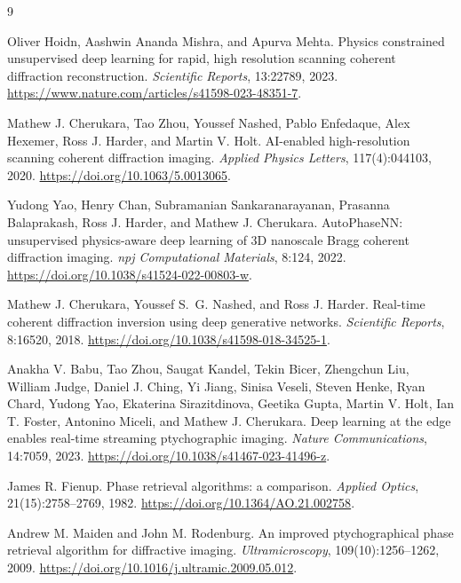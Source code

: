 \documentclass[11pt]{article}
\begin{document}
\begin{thebibliography}{9}

Oliver Hoidn, Aashwin Ananda Mishra, and Apurva Mehta.
\newblock Physics constrained unsupervised deep learning for rapid, high
resolution scanning coherent diffraction reconstruction.
\newblock \emph{Scientific Reports}, 13:22789, 2023.
\newblock \url{https://www.nature.com/articles/s41598-023-48351-7}.

Mathew J. Cherukara, Tao Zhou, Youssef Nashed, Pablo Enfedaque, Alex Hexemer,
Ross J. Harder, and Martin V. Holt.
\newblock AI-enabled high-resolution scanning coherent diffraction imaging.
\newblock \emph{Applied Physics Letters}, 117(4):044103, 2020.
\newblock \url{https://doi.org/10.1063/5.0013065}.

Yudong Yao, Henry Chan, Subramanian Sankaranarayanan, Prasanna Balaprakash,
Ross J. Harder, and Mathew J. Cherukara.
\newblock AutoPhaseNN: unsupervised physics-aware deep learning of 3D
nanoscale Bragg coherent diffraction imaging.
\newblock \emph{npj Computational Materials}, 8:124, 2022.
\newblock \url{https://doi.org/10.1038/s41524-022-00803-w}.

Mathew J. Cherukara, Youssef S.~G. Nashed, and Ross J. Harder.
\newblock Real-time coherent diffraction inversion using deep generative
networks.
\newblock \emph{Scientific Reports}, 8:16520, 2018.
\newblock \url{https://doi.org/10.1038/s41598-018-34525-1}.

Anakha V. Babu, Tao Zhou, Saugat Kandel, Tekin Bicer, Zhengchun Liu, William
Judge, Daniel J. Ching, Yi Jiang, Sinisa Veseli, Steven Henke, Ryan Chard,
Yudong Yao, Ekaterina Sirazitdinova, Geetika Gupta, Martin V. Holt, Ian T.
Foster, Antonino Miceli, and Mathew J. Cherukara.
\newblock Deep learning at the edge enables real-time streaming ptychographic
imaging.
\newblock \emph{Nature Communications}, 14:7059, 2023.
\newblock \url{https://doi.org/10.1038/s41467-023-41496-z}.

James R. Fienup.
\newblock Phase retrieval algorithms: a comparison.
\newblock \emph{Applied Optics}, 21(15):2758--2769, 1982.
\newblock \url{https://doi.org/10.1364/AO.21.002758}.

Andrew M. Maiden and John M. Rodenburg.
\newblock An improved ptychographical phase retrieval algorithm for diffractive
imaging.
\newblock \emph{Ultramicroscopy}, 109(10):1256--1262, 2009.
\newblock \url{https://doi.org/10.1016/j.ultramic.2009.05.012}.


\end{thebibliography}
\end{document}
